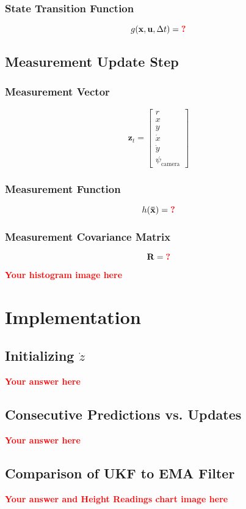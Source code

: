 \documentclass{article}
\newcommand{\todo}[1]{\textcolor{red}{\textbf{#1}}}
\begin{document}
\subsubsection{State Transition Function}

\begin{equation}
  g(\mathbf{x}, \mathbf{u}, \Delta t) = \todo{?}
\end{equation}

\subsection{Measurement Update Step}

\subsubsection{Measurement Vector}

\begin{equation}
\mathbf{z}_t = \begin{bmatrix}
r \\
x \\
y \\
\dot x \\
\dot y \\
\psi_{\text{camera}}
\end{bmatrix}
\end{equation}

\subsubsection{Measurement Function}

\begin{equation}
  h(\mathbf{\bar x}) = \todo{?}
\end{equation}

\subsubsection{Measurement Covariance Matrix}

\begin{equation}
  \mathbf{R} = \todo{?}
\end{equation}

\noindent \todo{Your histogram image here}

\section{Implementation}

\subsection{Initializing $\dot z$}
\todo{Your answer here}

\subsection{Consecutive Predictions vs. Updates}
\todo{Your answer here}

\subsection{Comparison of UKF to EMA Filter}
\todo{Your answer and Height Readings chart image here}
\end{document}
